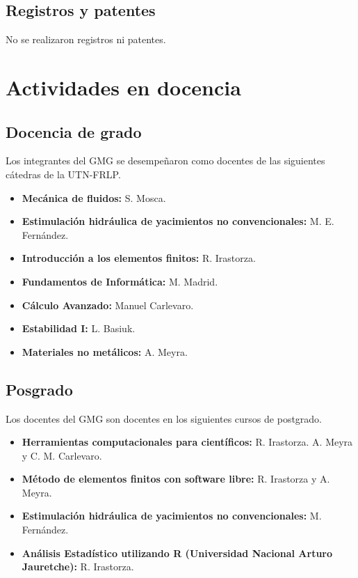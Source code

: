 \documentclass[a4paper,11pt,twoside,final,titlepage,onecolumn,openright]{report}
\begin{document}
\section{Registros y patentes}

No se realizaron registros ni patentes.


\chapter{Actividades en docencia}

\section{Docencia de grado}

Los integrantes del GMG se desempeñaron como docentes de las siguientes cátedras de la UTN-FRLP.

\begin{itemize}
 \item {\bf Mecánica de fluidos:} S. Mosca.
 \item {\bf Estimulación hidráulica de yacimientos no convencionales:} M. E. Fernández.
 \item {\bf Introducción a los elementos finitos:} R. Irastorza.
 \item {\bf Fundamentos de Informática:} M. Madrid.
 \item {\bf Cálculo Avanzado:} Manuel Carlevaro.
 \item \textbf{Estabilidad I:} L. Basiuk.
 \item \textbf{Materiales no metálicos:} A. Meyra.
\end{itemize}


\section{Posgrado}

Los docentes del GMG son docentes en los siguientes cursos de postgrado.

\begin{itemize}
 \item {\bf Herramientas computacionales para científicos:} R. Irastorza. A. Meyra y C. M. Carlevaro.
 \item \textbf{Método de elementos finitos con software libre:} R. Irastorza y A. Meyra.
 \item \textbf{Estimulación hidráulica de yacimientos no convencionales:} M. Fernández.
 \item {\bf Análisis Estadístico utilizando R (Universidad Nacional Arturo Jauretche):} R. Irastorza.
\end{itemize}
\end{document}
